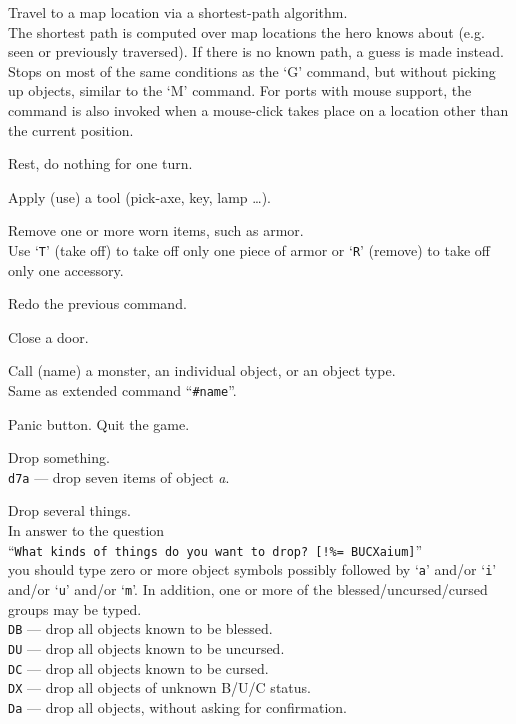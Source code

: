 Travel to a map location via a shortest-path algorithm.\\
The shortest path
is computed over map locations the hero knows about (e.g. seen or
previously traversed).  If there is no known path, a guess is made instead.
Stops on most of 
the same conditions as the `G' command, but without picking up
objects, similar to the `M' command.  For ports with mouse 
support, the command is also invoked when a mouse-click takes place on a 
location other than the current position.
\item[\tb{.}]
Rest, do nothing for one turn.
\item[\tb{a}]
Apply (use) a tool (pick-axe, key, lamp \ldots).
\item[\tb{A}]
Remove one or more worn items, such as armor.\\
Use `{\tt T}' (take off) to take off only one piece of armor 
or `{\tt R}' (remove) to take off only one accessory.
\item[\tb{\^{}A}]
Redo the previous command.
\item[\tb{c}]
Close a door.
\item[\tb{C}]
Call (name) a monster, an individual object, or an object type.\\
Same as extended command ``{\tt \#name}''.
\item[\tb{\^{}C}]
Panic button.  Quit the game.
\item[\tb{d}]
Drop something.\\
{\tt d7a} --- drop seven items of object
{\it a}.
\item[\tb{D}]
Drop several things.\\
In answer to the question\\
``{\tt What kinds of things do you want to drop? [!\%= BUCXaium]}''\\
you should type zero or more object symbols possibly followed by
`{\tt a}' and/or `{\tt i}' and/or `{\tt u}' and/or `{\tt m}'.
In addition, one or more of
the bless\-ed/\-un\-curs\-ed/\-curs\-ed groups may be typed.\\
{\tt DB}  --- drop all objects known to be blessed.\\
{\tt DU}  --- drop all objects known to be uncursed.\\
{\tt DC}  --- drop all objects known to be cursed.\\
{\tt DX}  --- drop all objects of unknown B/U/C status.\\
{\tt Da}  --- drop all objects, without asking for confirmation.\\
